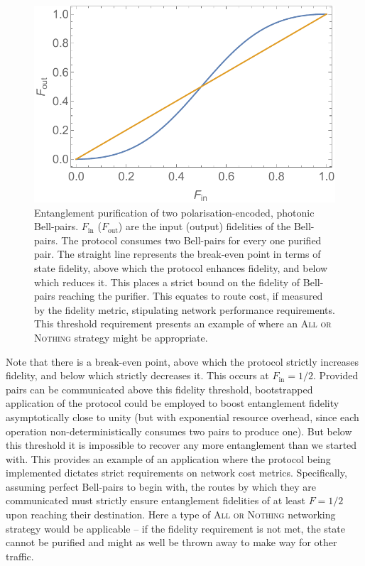 \documentclass[aps, rmp, twocolumn, amsmath, amssymb, nofootinbib, superscriptaddress, longbibliography, floatfix, table-of-contents, eqsecnum]{revtex4-1}
\begin{document}
\begin{figure}[!htb]
\includegraphics[width=\columnwidth]{ent_purif}
\caption{Entanglement purification of two polarisation-encoded, photonic Bell-pairs. $F_\text{in}$ ($F_\text{out}$) are the input (output) fidelities of the Bell-pairs. The protocol consumes two Bell-pairs for every one purified pair. The straight line represents the break-even point in terms of state fidelity, above which the protocol enhances fidelity, and below which reduces it. This places a strict bound on the fidelity of Bell-pairs reaching the purifier. This equates to route cost, if measured by the fidelity metric, stipulating network performance requirements. This threshold requirement presents an example of where an \textsc{All or Nothing} strategy might be appropriate.} \label{fig:ent_purif}
\end{figure}

Note that there is a break-even point, above which the protocol strictly increases fidelity, and below which strictly decreases it. This occurs at \mbox{$F_\text{in}=1/2$}. Provided pairs can be communicated above this fidelity threshold, bootstrapped application of the protocol could be employed to boost entanglement fidelity asymptotically close to unity (but with exponential resource overhead, since each operation non-deterministically consumes two pairs to produce one). But below this threshold it is impossible to recover any more entanglement than we started with. This provides an example of an application where the protocol being implemented dictates strict requirements on network cost metrics. Specifically, assuming perfect Bell-pairs to begin with, the routes by which they are communicated must strictly ensure entanglement fidelities of at least \mbox{$F=1/2$} upon reaching their destination. Here a type of \textsc{All or Nothing} networking strategy would be applicable -- if the fidelity requirement is not met, the state cannot be purified and might as well be thrown away to make way for other traffic.
\end{document}
